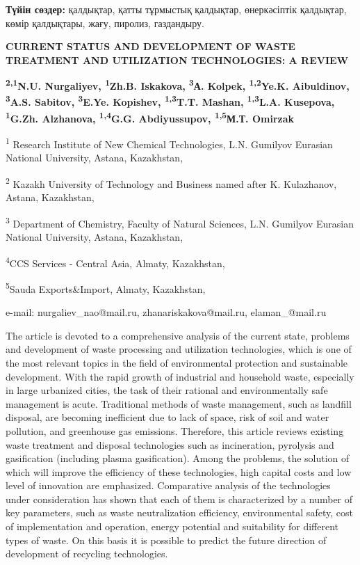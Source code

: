 {\bfseries Түйін сөздер:} қалдықтар, қатты тұрмыстық қалдықтар,
өнеркәсіптік қалдықтар, көмір қалдықтары, жағу, пиролиз, газдандыру.

\begin{articleheader}
{\bfseries CURRENT STATUS AND DEVELOPMENT OF WASTE TREATMENT AND UTILIZATION TECHNOLOGIES: A REVIEW}

{\bfseries
\textsuperscript{2,1}N.U. Nurgaliyev\textsuperscript{\envelope },
\textsuperscript{1}Zh.B. Iskakova\textsuperscript{\envelope },
\textsuperscript{3}А. Kolpek,
\textsuperscript{1,2}Ye.K. Aibuldinov\textsuperscript{\envelope },
\textsuperscript{3}A.S. Sabitov,
\textsuperscript{3}E.Ye. Kopishev,
\textsuperscript{1,3}T.T. Mashan,
\textsuperscript{1,3}L.A. Kusepova,
\textsuperscript{1}G.Zh. Alzhanova,
\textsuperscript{1,4}G.G. Abdiyussupov,
\textsuperscript{1,5}М.Т. Omirzak
}
\end{articleheader}

\begin{articleheader}
\textsuperscript{1} Research Institute of New Chemical Technologies, L.N. Gumilyov Eurasian National University, Astana, Kazakhstan,

\textsuperscript{2} Kazakh University of Technology and Business named after K. Kulazhanov, Astana, Kazakhstan,

\textsuperscript{3} Department of Chemistry, Faculty of Natural Sciences, L.N. Gumilyov Eurasian National University, Astana, Kazakhstan,

\textsuperscript{4}CCS Services - Central Asia, Almaty, Kazakhstan,

\textsuperscript{5}Sauda Exports\&Import, Almaty, Kazakhstan,

e-mail: nurgaliev\_nao@mail.ru, zhanariskakova@mail.ru, elaman\_@mail.ru
\end{articleheader}

The article is devoted to a comprehensive analysis of the current state,
problems and development of waste processing and utilization
technologies, which is one of the most relevant topics in the field of
environmental protection and sustainable development. With the rapid
growth of industrial and household waste, especially in large urbanized
cities, the task of their rational and environmentally safe management
is acute. Traditional methods of waste management, such as landfill
disposal, are becoming inefficient due to lack of space, risk of soil
and water pollution, and greenhouse gas emissions. Therefore, this
article reviews existing waste treatment and disposal technologies such
as incineration, pyrolysis and gasification (including plasma
gasification). Among the problems, the solution of which will improve
the efficiency of these technologies, high capital costs and low level
of innovation are emphasized. Comparative analysis of the technologies
under consideration has shown that each of them is characterized by a
number of key parameters, such as waste neutralization efficiency,
environmental safety, cost of implementation and operation, energy
potential and suitability for different types of waste. On this basis it
is possible to predict the future direction of development of recycling
technologies.

